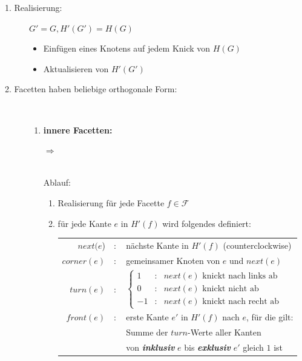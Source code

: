 \begin{description}
	\item[1. Realisierung:] $G'=G,H'(G')=H(G)$
		\begin{itemize}
			\item Einfügen eines Knotens auf jedem Knick von $H(G)$
			\item Aktualisieren von $H'(G')$
		\end{itemize}
	\item[2. Facetten haben beliebige orthogonale Form:]\ \\\vspace*{-\baselineskip}
		\begin{enumerate}
			\item \textbf{innere Facetten:}\\
			\vspace*{-\baselineskip}
				\begin{minipage}{0.3\textwidth}
					
				\end{minipage}
				{\Large{$\Longrightarrow$}}
				\begin{minipage}{0.4\textwidth}
					
				\end{minipage}\\
				Ablauf:
					\begin{enumerate}
						\item Realisierung für jede Facette $f\in\mathcal{F}$
						\item für jede Kante $e$ in $H'(f)$ wird folgendes definiert:\\
							\begin{tabular}{rcl}
								$next(e$)&$:$&nächste Kante in $H'(f)$ (counterclockwise)\\
								$corner(e)$&$:$& gemeinsamer Knoten von $e$ und $next(e)$\\
								$turn(e)$&$:$&$\left\{\begin{array}{rcl}
									1&:&next(e)\text{ knickt nach links ab}\\
									0&:&next(e)\text{ knickt nicht ab}\\
									-1&:&next(e)\text{ knickt nach recht ab}
								\end{array}\right.$\\
								$front(e)$&$:$& erste Kante $e'$ in $H'(f)$ nach $e$, für die gilt:\\
								&& Summe der $turn$-Werte aller Kanten\\
								&& von \textit{\textbf{inklusiv}} $e$ bis \textit{\textbf{exklusiv}} $e'$ gleich $1$ ist

\end{tabular}
\end{enumerate}
\end{enumerate}
\end{description}
